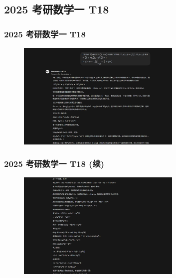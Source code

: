 \subsection{2025 考研数学一 T18}

\begin{frame}
\frametitle{2025 考研数学一 T18}
\begin{figure}
    \centering
    \includegraphics[width=0.7\textwidth]{./pic/7.png} %
    \label{fig:kaoyan_problem_1}
\end{figure}
\end{frame}

\begin{frame}
\frametitle{2025 考研数学一 T18 (续)}
\begin{figure}
    \centering
    \includegraphics[width=0.7\textwidth]{./pic/8.png} %
    \label{fig:kaoyan_problem_2}
\end{figure}
\end{frame}

